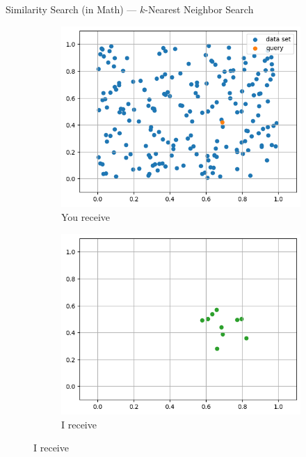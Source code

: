 \begin{frame}{Similarity Search (in Math) --- \(k\)-Nearest Neighbor Search}
    \begin{figure}[ht]
        \centering
        \caption*{\textbf{Trade offer}}
        \hfill
        \begin{subfigure}{0.42\textwidth}
            \caption*{You receive}
            \includegraphics[width=\textwidth]{images/sim-search-init.png}
        \end{subfigure}
        \hfill
        \begin{subfigure}{0.42\textwidth}
            \caption*{I receive}
            \includegraphics[width=\textwidth]{images/sim-search-knn.png}
        \end{subfigure}
        \hfill
    \end{figure}
\end{frame}


